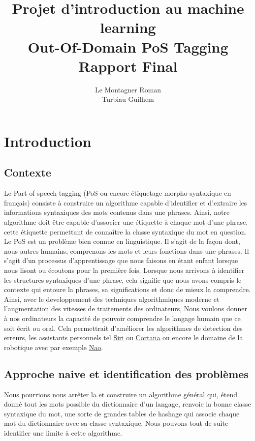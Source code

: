\documentclass[french, 14pt]{memoir}
\title{\textbf{Projet d'introduction au machine learning\\
Out-Of-Domain PoS Tagging
\\Rapport Final}}
\author{Le Montagner Roman\\
		Turbiau Guilhem\\}
\date{}
\begin{document}
\maketitle

\tableofcontents

\chapter{Introduction}
\section{Contexte}
Le Part of speech tagging (PoS ou encore étiquetage morpho-syntaxique en français) consiste à construire un algorithme capable d'identifier et d'extraire les informations syntaxiques des mots contenus dans une phrases. Ainsi, notre algorithme doit être capable d'associer une étiquette à chaque mot d'une phrase, cette étiquette permettant de connaître la classe syntaxique du mot en question.\\
Le PoS est un problème bien connue en linguistique. Il s'agit de la façon dont, nous autres humains, comprenons les mots et leurs fonctions dans une phrases. Il s'agit d'un processus d'apprentissage que nous faisons en étant enfant lorsque nous lisont ou écoutons pour la première fois. Lorsque nous arrivons à identifier les structures syntaxiques d'une phrase, cela signifie que nous avons compris le contexte qui entoure la phrases, sa significations et donc de mieux la comprendre. Ainsi, avec le developpement des techniques algorithmiques moderne et l'augmentation des vitesses de traitements des ordinateurs, Nous voulons donner à nos ordinateurs la capacité de pouvoir comprendre le langage humain que ce soit écrit ou oral. Cela permettrait d'améliorer les algorithmes de detection des erreurs, les assistants personnels tel \href{https://www.apple.com/fr/siri/}{Siri} ou \href{https://www.microsoft.com/en-us/cortana}{Cortana} ou encore le domaine de la robotique avec par exemple \href{https://www.softbankrobotics.com/emea/fr/nao}{Nao}.

\section{Approche naive et identification des problèmes}

Nous pourrions nous arrêter la et construire un algorithme général qui, étend donné tout les mots possible du dictionnaire d'un langage, renvoie la bonne classe syntaxique du mot, une sorte de grandes tables de hashage qui associe chaque mot du dictionnaire avec sa classe syntaxique. Nous pouvons tout de suite identifier une limite à cette algorithme.
\end{document}
